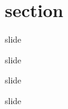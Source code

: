 \documentclass[
presentation.tex
]{subfiles}
\begin{document}
\section{section}


\begin{frame}{slide}
	
	slide
	
\end{frame}


\begin{frame}{slide}
	
	slide
	
\end{frame}
\end{document}

